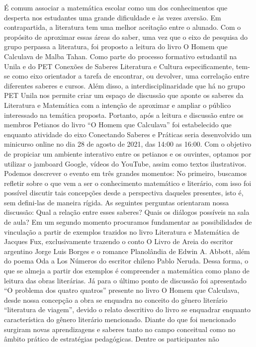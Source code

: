 É comum associar a matemática escolar como um dos conhecimentos que desperta nos
estudantes uma grande dificuldade e às vezes aversão. Em contrapartida, a literatura tem uma
melhor aceitação entre o alunado. Com o propósito de aproximar essas áreas do saber, uma vez
que o eixo de pesquisa do grupo perpassa a literatura, foi proposto a leitura do livro O Homem
que Calculava de Malba Tahan.
Como parte do processo formativo estudantil na Unila e do PET Conexões de Saberes Literatura
e Cultura especificamente, tem-se como eixo orientador a tarefa de encontrar, ou devolver, uma
correlação entre diferentes saberes e cursos. Além disso, a interdisciplinaridade que há no grupo
PET Unila nos permite criar um espaço de discussão que aponte os saberes da Literatura e
Matemática com a intenção de aproximar e ampliar o público interessado na temática proposta.
Portanto, após a leitura e discussão entre os membros Petianos do livro “O Homem que
Calculava” foi estabelecido que enquanto atividade do eixo Conectando Saberes e Práticas seria
desenvolvido um minicurso online no dia 28 de agosto de 2021, das 14:00 as 16:00. Com o
objetivo de propiciar um ambiente interativo entre os petianos e os ouvintes, optamos por utilizar
o jamboard Google, vídeos do YouTube, assim como textos ilustrativos.
Podemos descrever o evento em três grandes momentos: No primeiro, buscamos refletir sobre o
que vem a ser o conhecimento matemático e literário, com isso foi possível discutir tais
concepções desde a perspectiva daqueles presentes, isto é, sem defini-las de maneira rígida. As
seguintes perguntas orientaram nossa discussão: Qual a relação entre esses saberes? Quais os
diálogos possíveis na sala de aula?
Em um segundo momento procuramos fundamentar as possibilidades de vinculação a partir de
exemplos trazidos no livro Literatura e Matemática de Jacques Fux, exclusivamente trazendo o
conto O Livro de Areia do escritor argentino Jorge Luis Borges e o romance Planolândia de
Edwin A. Abbott, além do poema Oda a Los Números do escritor chileno Pablo Neruda. Dessa
forma, o que se almeja a partir dos exemplos é compreender a matemática como plano de leitura
das obras literárias. Já para o último ponto de discussão foi apresentado “O problema dos quatro
quatros” presente no livro O Homem que Calculava, desde nossa concepção a obra se enquadra
no conceito do gênero literário “literatura de viagem”, devido o relato descritivo do livro se
enquadrar enquanto característica do gênero literário mencionado.
Diante do que foi mencionado surgiram novas aprendizagens e saberes tanto no campo
conceitual como no âmbito prático de estratégias pedagógicas. Dentre os participantes não
